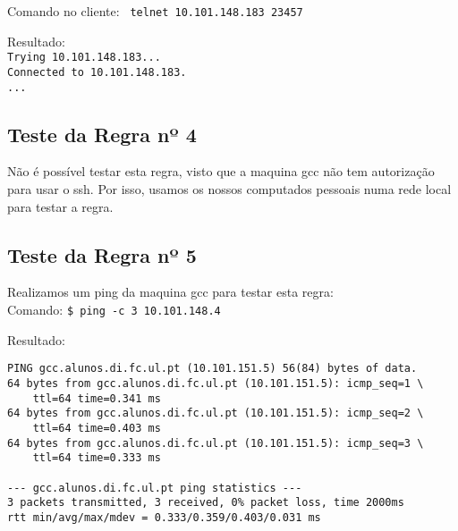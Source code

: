 \documentclass[12pt, a4paper, twoside]{report} %
\begin{document}
\noindent Comando no cliente: \texttt{ telnet 10.101.148.183 23457}

\noindent Resultado: \\

\noindent \texttt{Trying 10.101.148.183...} \\
\noindent \texttt{Connected to 10.101.148.183.} \\
\noindent \texttt{...}

\subsection{Teste da Regra nº 4}

\noindent Não é possível testar esta regra, visto que a maquina gcc não tem autorização para usar o ssh. Por isso, 
usamos os nossos computados pessoais numa rede local para testar a regra.

\subsection{Teste da Regra nº 5}

\noindent Realizamos um ping da maquina gcc para testar esta regra: \\

\noindent Comando: \texttt{\$ ping -c 3 10.101.148.4}

\noindent Resultado:

\begin{lstlisting}
PING gcc.alunos.di.fc.ul.pt (10.101.151.5) 56(84) bytes of data.
64 bytes from gcc.alunos.di.fc.ul.pt (10.101.151.5): icmp_seq=1 \
	ttl=64 time=0.341 ms
64 bytes from gcc.alunos.di.fc.ul.pt (10.101.151.5): icmp_seq=2 \
	ttl=64 time=0.403 ms
64 bytes from gcc.alunos.di.fc.ul.pt (10.101.151.5): icmp_seq=3 \
	ttl=64 time=0.333 ms

--- gcc.alunos.di.fc.ul.pt ping statistics ---
3 packets transmitted, 3 received, 0% packet loss, time 2000ms
rtt min/avg/max/mdev = 0.333/0.359/0.403/0.031 ms
\end{lstlisting}
\end{document}
